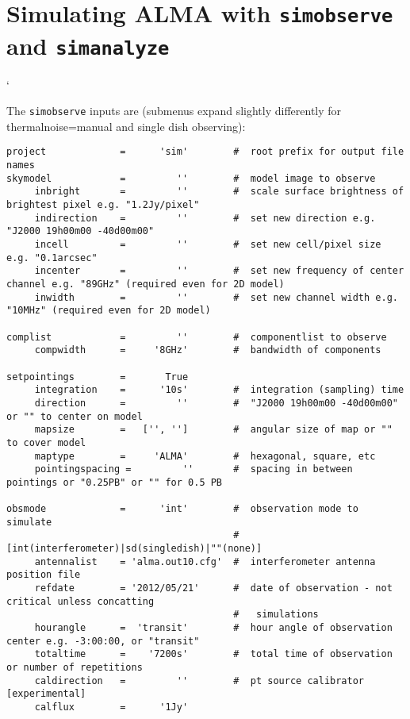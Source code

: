 \section{Simulating ALMA with {\tt simobserve} and {\tt simanalyze}}`
\label{section:sim.almasimmos}

The {\tt simobserve} inputs are (submenus expand slightly differently for thermalnoise=manual and single dish observing):
\small
\begin{verbatim}
project             =      'sim'        #  root prefix for output file names
skymodel            =         ''        #  model image to observe
     inbright       =         ''        #  scale surface brightness of brightest pixel e.g. "1.2Jy/pixel"
     indirection    =         ''        #  set new direction e.g. "J2000 19h00m00 -40d00m00"
     incell         =         ''        #  set new cell/pixel size e.g. "0.1arcsec"
     incenter       =         ''        #  set new frequency of center channel e.g. "89GHz" (required even for 2D model)
     inwidth        =         ''        #  set new channel width e.g. "10MHz" (required even for 2D model)

complist            =         ''        #  componentlist to observe
     compwidth      =     '8GHz'        #  bandwidth of components

setpointings        =       True        
     integration    =      '10s'        #  integration (sampling) time
     direction      =         ''        #  "J2000 19h00m00 -40d00m00" or "" to center on model
     mapsize        =   ['', '']        #  angular size of map or "" to cover model
     maptype        =     'ALMA'        #  hexagonal, square, etc
     pointingspacing =         ''       #  spacing in between pointings or "0.25PB" or "" for 0.5 PB

obsmode             =      'int'        #  observation mode to simulate
                                        #   [int(interferometer)|sd(singledish)|""(none)]
     antennalist    = 'alma.out10.cfg'  #  interferometer antenna position file
     refdate        = '2012/05/21'      #  date of observation - not critical unless concatting
                                        #   simulations
     hourangle      =  'transit'        #  hour angle of observation center e.g. -3:00:00, or "transit"
     totaltime      =    '7200s'        #  total time of observation or number of repetitions
     caldirection   =         ''        #  pt source calibrator [experimental]
     calflux        =      '1Jy'        


\end{verbatim}
